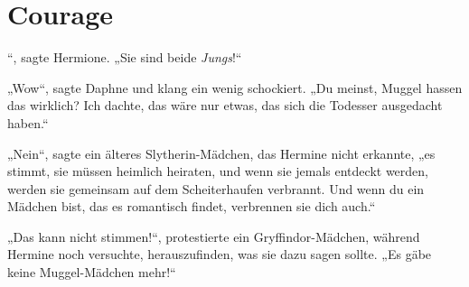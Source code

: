 \chapter{Courage}

“, sagte Hermione.
„Sie sind beide \emph{Jungs}!“

\hplettrineextrapara
„Wow“, sagte Daphne und klang ein wenig schockiert.
„Du meinst, Muggel hassen das wirklich? Ich dachte, das wäre nur etwas, das sich die Todesser ausgedacht haben.“

„Nein“, sagte ein älteres Slytherin-Mädchen, das Hermine nicht erkannte, „es stimmt, sie müssen heimlich heiraten, und wenn sie jemals entdeckt werden, werden sie gemeinsam auf dem Scheiterhaufen verbrannt. Und wenn du ein Mädchen bist, das es romantisch findet, verbrennen sie dich auch.“

„Das kann nicht stimmen!“, protestierte ein Gryffindor-Mädchen, während Hermine noch versuchte, herauszufinden, was sie dazu sagen sollte.
„Es gäbe keine Muggel-Mädchen mehr!“

